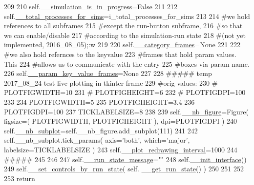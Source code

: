 \begin{DoxyCode}
209 
210         self.\hyperlink{classnegui_1_1pgguisimupop__experimental_1_1PGGuiSimuPop_ab447db99ace576103f91035bae30648c}{\_\_simulation\_is\_in\_progress}=\textcolor{keyword}{False}
211 
212         self.\hyperlink{classnegui_1_1pgguisimupop__experimental_1_1PGGuiSimuPop_a17fa6217c115c1bd7d525f48eb0882cf}{\_\_total\_processes\_for\_sims}=i\_total\_processes\_for\_sims
213 
214         \textcolor{comment}{#we hold references to all subframes}
215         \textcolor{comment}{#except the run-button subframe,}
216         \textcolor{comment}{#so that we can enable/disable}
217         \textcolor{comment}{#according to the simulation-run state}
218         \textcolor{comment}{#(not yet implemented, 2016\_08\_05);:w}
219 
220         self.\hyperlink{classnegui_1_1pgguisimupop__experimental_1_1PGGuiSimuPop_a28df18cbdb6acb5bfa3d4acea286f5ea}{\_\_category\_frames}=\textcolor{keywordtype}{None}
221 
222         \textcolor{comment}{#we also hold refernces to the keyvalue}
223         \textcolor{comment}{#frames that hold param values.  This}
224         \textcolor{comment}{#allows us to communicate with the entry}
225         \textcolor{comment}{#boxes via param name.}
226         self.\hyperlink{classnegui_1_1pgguisimupop__experimental_1_1PGGuiSimuPop_ad95dc47c19913b4eb1a4151af1e5879d}{\_\_param\_key\_value\_frames}=\textcolor{keywordtype}{None}
227 
228         \textcolor{comment}{##### temp 2017\_08\_24 test live plotting in tkinter frame}
229         \textcolor{comment}{#orig values:}
230 \textcolor{comment}{#       PLOTFIGWIDTH=10}
231 \textcolor{comment}{#       PLOTFIGHEIGHT=6}
232 \textcolor{comment}{#       PLOTFIGDPI=100}
233 
234         PLOTFIGWIDTH=5
235         PLOTFIGHEIGHT=3.4
236         PLOTFIGDPI=100
237         TICKLABELSIZE=8
238 
239         self.\hyperlink{classnegui_1_1pgguisimupop__experimental_1_1PGGuiSimuPop_a9e8696f97d0c0e5f06e8a6b7802adbfb}{\_\_nb\_figure}=Figure( figsize=( PLOTFIGWIDTH, PLOTFIGHEIGHT ), dpi=PLOTFIGDPI )
240         self.\hyperlink{classnegui_1_1pgguisimupop__experimental_1_1PGGuiSimuPop_a0f6fe42cbf29e962fbd1e7462137fbdc}{\_\_nb\_subplot}=self.\_\_nb\_figure.add\_subplot(111)
241 
242         self.\_\_nb\_subplot.tick\_params( axis=\textcolor{stringliteral}{'both'}, which=\textcolor{stringliteral}{'major'}, labelsize=TICKLABELSIZE )
243         self.\hyperlink{classnegui_1_1pgguisimupop__experimental_1_1PGGuiSimuPop_a8eadef43e925b015c7bb258489c38a27}{\_\_plot\_redrawing\_interval}=1000
244         \textcolor{comment}{#####   }
245 
246 
247         self.\hyperlink{classnegui_1_1pgguisimupop__experimental_1_1PGGuiSimuPop_a7d0800086000f1ac70457b67d5ed3f24}{\_\_run\_state\_message}=\textcolor{stringliteral}{""}
248         self.\hyperlink{classnegui_1_1pgguisimupop__experimental_1_1PGGuiSimuPop_a283ab320f883871f0580878258dfa52c}{\_\_init\_interface}()
249         self.\hyperlink{classnegui_1_1pgguisimupop__experimental_1_1PGGuiSimuPop_a40ed6eb7e992cb6e67c311ce491e2f8e}{\_\_set\_controls\_by\_run\_state}( self.
      \hyperlink{classnegui_1_1pgguisimupop__experimental_1_1PGGuiSimuPop_aa4ba011d69c343227c5331df6e3d7884}{\_\_get\_run\_state}() )
250 
251 
252 
253         \textcolor{keywordflow}{return}
\end{DoxyCode}


